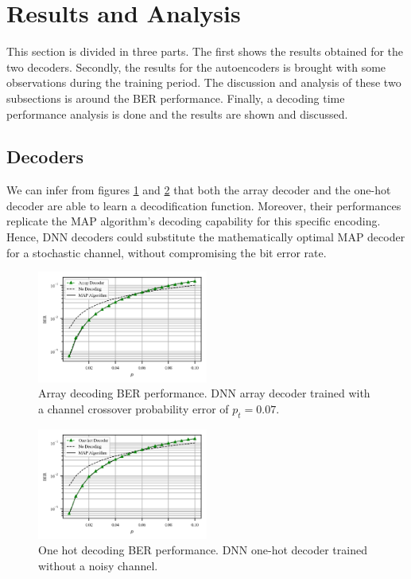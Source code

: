\documentclass[conference]{IEEEtran}
\begin{document}
\section{Results and Analysis}

This section is divided in three parts. The first shows the results obtained for the two decoders. Secondly, the results for the autoencoders is brought with some observations during the training period. The discussion and analysis of these two subsections is around the BER performance. Finally, a decoding time performance analysis is done and the results are shown and discussed.

\subsection{Decoders}

We can infer from figures \ref{fig:ArrayD} and \ref{fig:1HD} that both the array decoder and the one-hot decoder are able to learn a decodification function. Moreover, their performances replicate the MAP algorithm's decoding capability for this specific encoding. Hence, DNN decoders could substitute the mathematically optimal MAP decoder for a stochastic channel, without compromising the bit error rate.

\begin{figure}[!ht]
  \centering
    \includegraphics[width=0.5\textwidth]{images/MLNN_Mep_65536_ptrain_007}
    \caption{Array decoding BER performance. DNN array decoder trained with a channel crossover probability error of $p_t=0.07$.}\label{fig:ArrayD}
\end{figure}

\begin{figure}[!ht]
  \centering
    \includegraphics[width=0.5\textwidth]{images/MLNN1H_Mep_16384_ptrain_0}
    \caption{One hot decoding BER performance. DNN one-hot decoder trained without a noisy channel.}\label{fig:1HD}
\end{figure}
\end{document}
